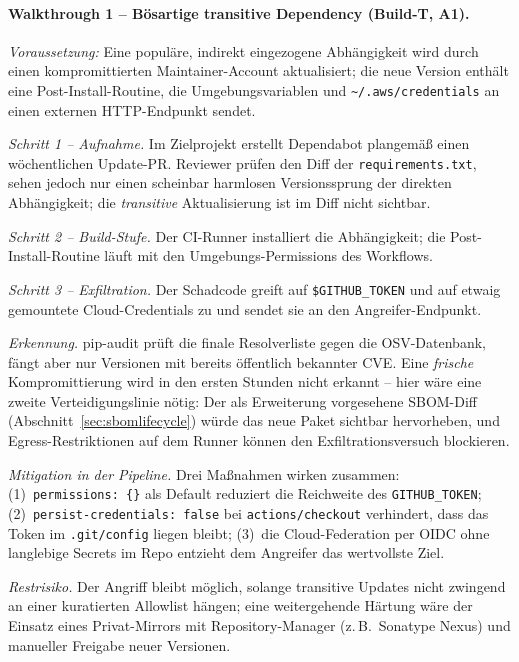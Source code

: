\documentclass[12pt, a4paper]{scrartcl}
\begin{document}
\paragraph{Walkthrough 1 -- Bösartige transitive Dependency
(Build-T, A1).}
\textit{Voraussetzung:} Eine populäre, indirekt eingezogene Abhängigkeit
wird durch einen kompromittierten Maintainer-Account aktualisiert; die
neue Version enthält eine Post-Install-Routine, die Umgebungsvariablen
und \texttt{\textasciitilde/.aws/credentials} an einen externen
HTTP-Endpunkt sendet.

\textit{Schritt 1 -- Aufnahme.} Im Zielprojekt erstellt Dependabot
plangemäß einen wöchentlichen Update-PR. Reviewer prüfen den Diff der
\texttt{requirements.txt}, sehen jedoch nur einen scheinbar
harmlosen Versionssprung der direkten Abhängigkeit; die
\emph{transitive} Aktualisierung ist im Diff nicht sichtbar.

\textit{Schritt 2 -- Build-Stufe.} Der CI-Runner installiert die
Abhängigkeit; die Post-Install-Routine läuft mit den
Umgebungs-Permissions des Workflows.

\textit{Schritt 3 -- Exfiltration.} Der Schadcode greift auf
\texttt{\$GITHUB\_TOKEN} und auf etwaig gemountete Cloud-Credentials zu
und sendet sie an den Angreifer-Endpunkt.

\textit{Erkennung.} pip-audit prüft die finale Resolverliste gegen die
OSV-Datenbank, fängt aber nur Versionen mit bereits öffentlich
bekannter CVE. Eine \emph{frische} Kompromittierung wird in den ersten
Stunden nicht erkannt -- hier wäre eine zweite Verteidigungslinie nötig:
Der als Erweiterung vorgesehene SBOM-Diff
(Abschnitt~\ref{sec:sbomlifecycle}) würde das neue Paket sichtbar
hervorheben, und Egress-Restriktionen auf dem Runner können den
Exfiltrationsversuch blockieren.

\textit{Mitigation in der Pipeline.} Drei Maßnahmen wirken zusammen:
(1)~\texttt{permissions: \{\}} als Default reduziert die Reichweite des
\texttt{GITHUB\_TOKEN}; (2)~\texttt{persist-credentials: false} bei
\texttt{actions/checkout} verhindert, dass das Token im
\texttt{.git/config} liegen bleibt; (3)~die Cloud-Federation per OIDC
ohne langlebige Secrets im Repo entzieht dem Angreifer das wertvollste
Ziel.

\textit{Restrisiko.} Der Angriff bleibt möglich, solange transitive
Updates nicht zwingend an einer kuratierten Allowlist hängen; eine
weitergehende Härtung wäre der Einsatz eines Privat-Mirrors mit
Repository-Manager (z.\,B.\ Sonatype Nexus) und manueller Freigabe
neuer Versionen.
\end{document}
